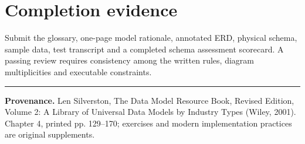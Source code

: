 \documentclass[11pt,letterpaper]{article}
\begin{document}
\section{Completion evidence}
Submit the glossary, one-page model rationale, annotated ERD, physical schema, sample data, test transcript and a completed schema assessment scorecard. A passing review requires consistency among the written rules, diagram multiplicities and executable constraints.


\vfill
\hrule
{\footnotesize\textbf{Provenance.} Len Silverston, The Data Model Resource Book, Revised Edition, Volume 2: A Library of Universal Data Models by Industry Types (Wiley, 2001). Chapter 4, printed pp. 129--170; exercises and modern implementation practices are original supplements.}
\end{document}
